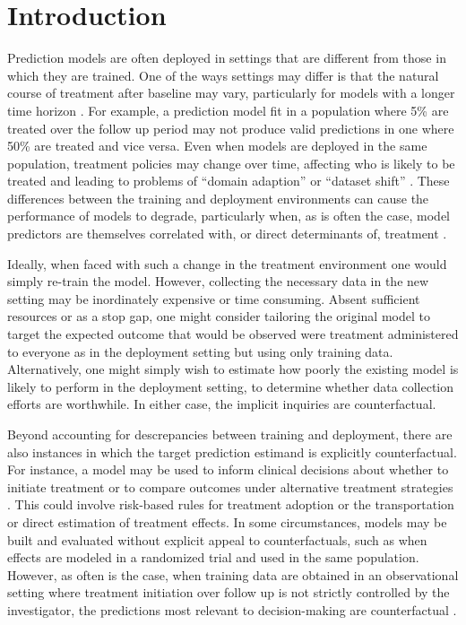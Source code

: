 \section{Introduction} \label{sec:introduction}
Prediction models are often deployed in settings that are different from those in which they are trained. One of the ways settings may differ is that the natural course of treatment after baseline may vary, particularly for models with a longer time horizon \cite{van_geloven_prediction_2020}. For example, a prediction model fit in a population where 5\% are treated over the follow up period may not produce valid predictions in one where 50\% are treated and vice versa. Even when models are deployed in the same population, treatment policies may change over time, affecting who is likely to be treated and leading to problems of ``domain adaption'' or ``dataset shift'' \cite{finlayson_clinician_2021,subbaswamy_development_2020}. These differences between the training and deployment environments can cause the performance of models to degrade, particularly when, as is often the case, model predictors are themselves correlated with, or direct determinants of, treatment \cite{pajouheshnia_accounting_2017}. 

Ideally, when faced with such a change in the treatment environment one would simply re-train the model. However, collecting the necessary data  in the new setting may be inordinately expensive or time consuming. Absent sufficient resources or as a stop gap, one might consider tailoring the original model to target the expected outcome that would be observed were treatment administered to everyone as in the deployment setting but using only training data. Alternatively, one might simply wish to estimate how poorly the existing model is likely to perform in the deployment setting, to determine whether data collection efforts are worthwhile. In either case, the implicit inquiries are counterfactual.

Beyond accounting for descrepancies between training and deployment, there are also instances in which the target prediction estimand is explicitly counterfactual. For instance, a model may be used to inform clinical decisions about whether to initiate treatment or to compare outcomes under alternative treatment strategies \cite{lin_scoping_2021,dickerman_predicting_2022,schulam_reliable_2017-1}. This could involve risk-based rules for treatment adoption or the transportation or direct estimation of treatment effects. In some circumstances, models may be built and evaluated without explicit appeal to counterfactuals, such as when effects are modeled in a randomized trial and used in the same population. However, as often is the case, when training data are obtained in an observational setting where treatment initiation over follow up is not strictly controlled by the investigator, the predictions most relevant to decision-making are counterfactual \cite{dickerman_counterfactual_2020,schulam_reliable_2017-1}. 

